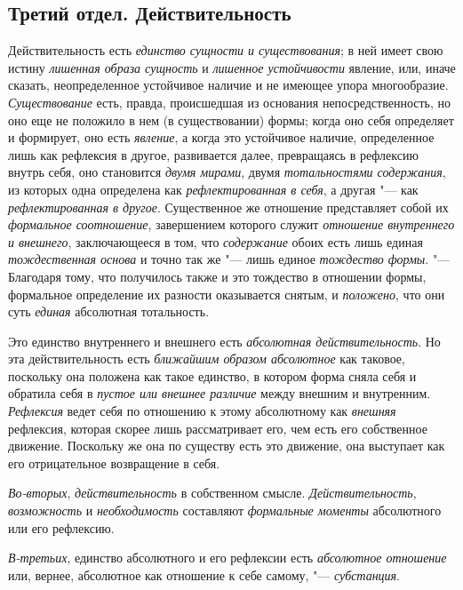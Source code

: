 \clearpage
\subsection[{\em Третий отдел} ДЕЙСТВИТЕЛЬНОСТЬ]
{Третий отдел. Действительность}

Действительность есть
{\em единство сущности и существования}; в ней имеет
свою истину {\em лишенная образа сущность} и
{\em лишенное устойчивости} явление, или, иначе
сказать, неопределенное устойчивое наличие и не имеющее упора многообразие.
{\em Существование} есть, правда, происшедшая из
основания непосредственность, но оно еще не положило в нем (в
существовании) формы; когда оно себя определяет и формирует, оно есть
{\em явление}, а когда это устойчивое наличие,
определенное лишь как рефлексия в другое, развивается далее, превращаясь в
рефлексию внутрь себя, оно становится {\em двумя
мирами}, двумя {\em тотальностями содержания}, из
которых одна определена как {\em рефлектированная в
себя}, а другая "--- как {\em рефлектированная в другое}.
Существенное же отношение представляет собой их
{\em формальное соотношение}, завершением которого
служит {\em отношение внутреннего и внешнего},
заключающееся в том, что {\em содержание} обоих есть
лишь единая {\em тождественная основа} и точно так же
"--- лишь единое {\em тождество формы}. "--- Благодаря тому,
что получилось также и это тождество в отношении формы, формальное
определение их разности оказывается снятым, и
{\em положено}, что они суть {\em единая} абсолютная тотальность.

Это единство внутреннего и внешнего есть {\em абсолютная
действительность}. Но эта действительность есть
{\em ближайшим образом абсолютное} как таковое,
поскольку она положена как такое единство, в котором форма сняла себя и
обратила себя в {\em пустое или внешнее различие} между
внешним и внутренним. {\em Рефлексия} ведет себя по
отношению к этому абсолютному как {\em внешняя}
рефлексия, которая скорее лишь рассматривает его, чем есть его собственное
движение. Поскольку же она по существу есть это движение, она выступает как
его отрицательное возвращение в себя.

{\em Во-вторых}, {\em действительность} в собственном смысле.
{\em Действительность}, {\em возможность} и {\em необходимость} составляют
{\em формальные моменты} абсолютного или его рефлексию.

{\em В-третьих}, единство абсолютного и его рефлексии
есть {\em абсолютное отношение} или, вернее, абсолютное
как отношение к себе самому, "--- {\em субстанция}.


